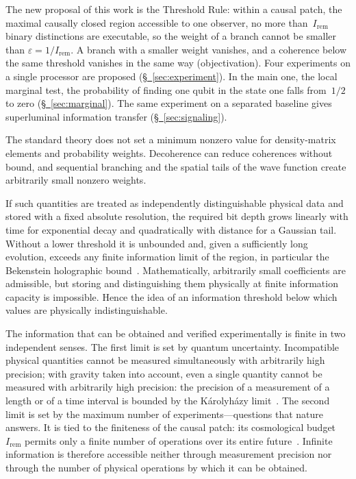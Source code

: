 \documentclass[11pt,a4paper]{article}
\newcommand{\Ost}{I_{\mathrm{rem}}}
\newcommand{\CollapseRule}{Threshold Rule}
\begin{document}
The new proposal of this work is the \CollapseRule{}: within a causal patch, the maximal causally closed region accessible to one observer, no more than~$\Ost$ binary distinctions are executable, so the weight of a branch cannot be smaller than $\varepsilon=1/\Ost$. A branch with a smaller weight vanishes, and a coherence below the same threshold vanishes in the same way (objectivation). Four experiments on a single processor are proposed (\hyperref[sec:experiment]{\S~\ref*{sec:experiment}}). In the main one, the local marginal test, the probability of finding one qubit in the state one falls from~$1/2$ to zero (\hyperref[sec:marginal]{\S~\ref*{sec:marginal}}). The same experiment on a separated baseline gives superluminal information transfer (\hyperref[sec:signaling]{\S~\ref*{sec:signaling}}).

The standard theory does not set a minimum nonzero value for density-matrix elements and probability weights. Decoherence can reduce coherences without bound, and sequential branching and the spatial tails of the wave function create arbitrarily small nonzero weights.

If such quantities are treated as independently distinguishable physical data and stored with a fixed absolute resolution, the required bit depth grows linearly with time for exponential decay and quadratically with distance for a Gaussian tail. Without a lower threshold it is unbounded and, given a sufficiently long evolution, exceeds any finite information limit of the region, in particular the Bekenstein holographic bound~\cite{bousso2002}. Mathematically, arbitrarily small coefficients are admissible, but storing and distinguishing them physically at finite information capacity is impossible. Hence the idea of an information threshold below which values are physically indistinguishable.

The information that can be obtained and verified experimentally is finite in two independent senses. The first limit is set by quantum uncertainty. Incompatible physical quantities cannot be measured simultaneously with arbitrarily high precision; with gravity taken into account, even a single quantity cannot be measured with arbitrarily high precision: the precision of a measurement of a length or of a time interval is bounded by the K\'arolyh\'azy limit~\cite{karolyhazy1966}. The second limit is set by the maximum number of experiments---questions that nature answers. It is tied to the finiteness of the causal patch: its cosmological budget~$\Ost$ permits only a finite number of operations over its entire future~\cite{lloyd2000,lloyd2002,banks2001,krauss2004}. Infinite information is therefore accessible neither through measurement precision nor through the number of physical operations by which it can be obtained.
\end{document}
